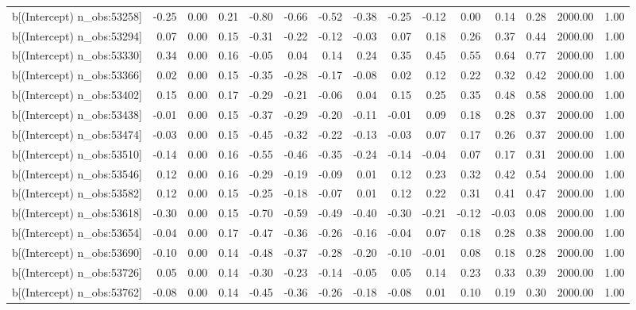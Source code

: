 \begin{table}[ht]
\begin{tabular}{rrrrrrrrrrrrrrr}
  b[(Intercept) n\_obs:53258] & -0.25 & 0.00 & 0.21 & -0.80 & -0.66 & -0.52 & -0.38 & -0.25 & -0.12 & 0.00 & 0.14 & 0.28 & 2000.00 & 1.00 \\ 
  b[(Intercept) n\_obs:53294] & 0.07 & 0.00 & 0.15 & -0.31 & -0.22 & -0.12 & -0.03 & 0.07 & 0.18 & 0.26 & 0.37 & 0.44 & 2000.00 & 1.00 \\ 
  b[(Intercept) n\_obs:53330] & 0.34 & 0.00 & 0.16 & -0.05 & 0.04 & 0.14 & 0.24 & 0.35 & 0.45 & 0.55 & 0.64 & 0.77 & 2000.00 & 1.00 \\ 
  b[(Intercept) n\_obs:53366] & 0.02 & 0.00 & 0.15 & -0.35 & -0.28 & -0.17 & -0.08 & 0.02 & 0.12 & 0.22 & 0.32 & 0.42 & 2000.00 & 1.00 \\ 
  b[(Intercept) n\_obs:53402] & 0.15 & 0.00 & 0.17 & -0.29 & -0.21 & -0.06 & 0.04 & 0.15 & 0.25 & 0.35 & 0.48 & 0.58 & 2000.00 & 1.00 \\ 
  b[(Intercept) n\_obs:53438] & -0.01 & 0.00 & 0.15 & -0.37 & -0.29 & -0.20 & -0.11 & -0.01 & 0.09 & 0.18 & 0.28 & 0.37 & 2000.00 & 1.00 \\ 
  b[(Intercept) n\_obs:53474] & -0.03 & 0.00 & 0.15 & -0.45 & -0.32 & -0.22 & -0.13 & -0.03 & 0.07 & 0.17 & 0.26 & 0.37 & 2000.00 & 1.00 \\ 
  b[(Intercept) n\_obs:53510] & -0.14 & 0.00 & 0.16 & -0.55 & -0.46 & -0.35 & -0.24 & -0.14 & -0.04 & 0.07 & 0.17 & 0.31 & 2000.00 & 1.00 \\ 
  b[(Intercept) n\_obs:53546] & 0.12 & 0.00 & 0.16 & -0.29 & -0.19 & -0.09 & 0.01 & 0.12 & 0.23 & 0.32 & 0.42 & 0.54 & 2000.00 & 1.00 \\ 
  b[(Intercept) n\_obs:53582] & 0.12 & 0.00 & 0.15 & -0.25 & -0.18 & -0.07 & 0.01 & 0.12 & 0.22 & 0.31 & 0.41 & 0.47 & 2000.00 & 1.00 \\ 
  b[(Intercept) n\_obs:53618] & -0.30 & 0.00 & 0.15 & -0.70 & -0.59 & -0.49 & -0.40 & -0.30 & -0.21 & -0.12 & -0.03 & 0.08 & 2000.00 & 1.00 \\ 
  b[(Intercept) n\_obs:53654] & -0.04 & 0.00 & 0.17 & -0.47 & -0.36 & -0.26 & -0.16 & -0.04 & 0.07 & 0.18 & 0.28 & 0.38 & 2000.00 & 1.00 \\ 
  b[(Intercept) n\_obs:53690] & -0.10 & 0.00 & 0.14 & -0.48 & -0.37 & -0.28 & -0.20 & -0.10 & -0.01 & 0.08 & 0.18 & 0.28 & 2000.00 & 1.00 \\ 
  b[(Intercept) n\_obs:53726] & 0.05 & 0.00 & 0.14 & -0.30 & -0.23 & -0.14 & -0.05 & 0.05 & 0.14 & 0.23 & 0.33 & 0.39 & 2000.00 & 1.00 \\ 
  b[(Intercept) n\_obs:53762] & -0.08 & 0.00 & 0.14 & -0.45 & -0.36 & -0.26 & -0.18 & -0.08 & 0.01 & 0.10 & 0.19 & 0.30 & 2000.00 & 1.00 \\ 

\end{tabular}
\end{table}
